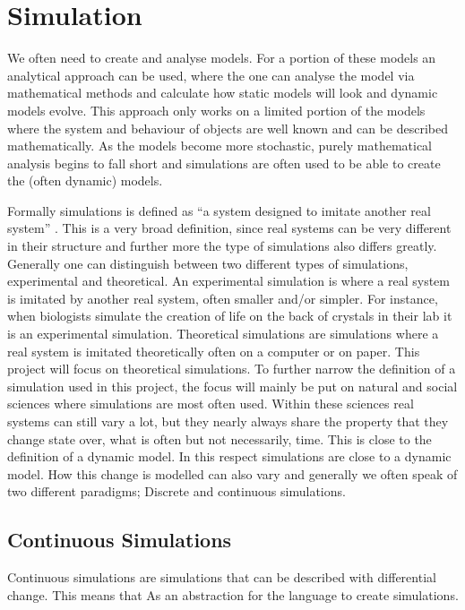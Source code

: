 \section{Simulation}
We often need to create and analyse models. For a portion of these models an analytical approach can be used, where the one can analyse the model via mathematical methods and calculate how static models will look and dynamic models evolve. This approach only works on a limited portion of the models where the system and behaviour of objects are well known and can be described mathematically. As the models become more stochastic, purely mathematical analysis begins to fall short and simulations are often used to be able to create the (often dynamic) models.

Formally simulations is defined as \enquote{a system designed to imitate another real system} . This is a very broad definition, since real systems can be very different in their structure and further more the type of simulations also differs greatly. Generally one can distinguish between two different types of simulations, experimental and theoretical. An experimental simulation is where a real system is imitated by another real system, often smaller and/or simpler. For instance, when biologists simulate the creation of life on the back of crystals in their lab it is an experimental simulation. Theoretical simulations are simulations where a real system is imitated theoretically often on a computer or on paper. This project will focus on theoretical simulations. To further narrow the definition of a simulation used in this project, the focus will mainly be put on natural and social sciences where simulations are most often used. Within these sciences real systems can still vary a lot, but they nearly always share the property that they change state over, what is often but not necessarily, time. This is close to the definition of a dynamic model. In this respect simulations are close to a dynamic model. How this change is modelled can also vary and generally we often speak of two different paradigms; Discrete and continuous simulations.


\subsection{Continuous Simulations}
Continuous simulations are simulations that can be described with differential change. This means that 
\label{simulationchoise}
As an abstraction for the language to create simulations.


